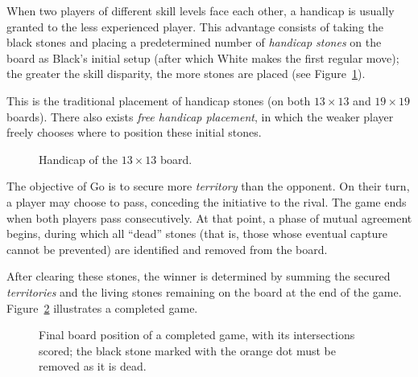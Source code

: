 When two players of different skill levels face each other, a handicap is usually granted to the less experienced player. This advantage consists of taking the
black stones and placing a predetermined number of \textit{handicap stones} on the board as Black's initial setup (after which White makes the first regular
move); the greater the skill disparity, the more stones are placed (see Figure~\ref{fig:14}).

This is the traditional placement of handicap stones (on both \(13 \times 13\) and \(19 \times 19\) boards). There also exists \textit{free handicap placement}, in which the weaker player freely chooses where to position these initial stones.
\begin{figure}[H]
	\centering
	\begin{goban}[13, hoshi = false]
	\end{goban}
	\caption{Handicap of the $13\times13$ board.}
	\label{fig:14}
\end{figure}

The objective of Go is to secure more \textit{territory} than the opponent. On their turn, a player may choose to pass, conceding the initiative to the rival. The game ends when both players pass consecutively. At that point, a phase of mutual agreement begins, during which all ``dead'' stones (that is, those whose eventual capture cannot be prevented) are identified and removed from the board.

After clearing these stones, the winner is determined by summing the secured
\textit{territories} and the living stones remaining on the board at the end of
the game. Figure~\ref{fig: Fig 10} illustrates a completed game.

\begin{figure}[H]
	\centering
	\begin{goban}[7, hoshi = false]
	\end{goban}
	\caption{
		Final board position of a completed game, with its intersections scored; the black stone marked with the \textcolor{terracotta}{orange} dot must be removed as it is dead.}
	\label{fig: Fig 10}
\end{figure}

